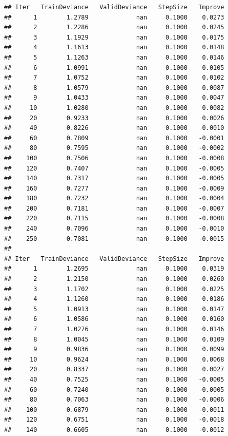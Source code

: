 \documentclass[
]{book}
\begin{document}
\begin{verbatim}
## Iter   TrainDeviance   ValidDeviance   StepSize   Improve
##      1        1.2789             nan     0.1000    0.0273
##      2        1.2286             nan     0.1000    0.0245
##      3        1.1929             nan     0.1000    0.0175
##      4        1.1613             nan     0.1000    0.0148
##      5        1.1263             nan     0.1000    0.0146
##      6        1.0991             nan     0.1000    0.0105
##      7        1.0752             nan     0.1000    0.0102
##      8        1.0579             nan     0.1000    0.0087
##      9        1.0433             nan     0.1000    0.0047
##     10        1.0280             nan     0.1000    0.0082
##     20        0.9233             nan     0.1000    0.0026
##     40        0.8226             nan     0.1000    0.0010
##     60        0.7809             nan     0.1000   -0.0001
##     80        0.7595             nan     0.1000   -0.0002
##    100        0.7506             nan     0.1000   -0.0008
##    120        0.7407             nan     0.1000   -0.0005
##    140        0.7317             nan     0.1000   -0.0005
##    160        0.7277             nan     0.1000   -0.0009
##    180        0.7232             nan     0.1000   -0.0004
##    200        0.7181             nan     0.1000   -0.0007
##    220        0.7115             nan     0.1000   -0.0008
##    240        0.7096             nan     0.1000   -0.0010
##    250        0.7081             nan     0.1000   -0.0015
## 
## Iter   TrainDeviance   ValidDeviance   StepSize   Improve
##      1        1.2695             nan     0.1000    0.0319
##      2        1.2150             nan     0.1000    0.0260
##      3        1.1702             nan     0.1000    0.0225
##      4        1.1260             nan     0.1000    0.0186
##      5        1.0913             nan     0.1000    0.0147
##      6        1.0586             nan     0.1000    0.0160
##      7        1.0276             nan     0.1000    0.0146
##      8        1.0045             nan     0.1000    0.0109
##      9        0.9836             nan     0.1000    0.0099
##     10        0.9624             nan     0.1000    0.0068
##     20        0.8337             nan     0.1000    0.0027
##     40        0.7525             nan     0.1000   -0.0005
##     60        0.7240             nan     0.1000   -0.0005
##     80        0.7063             nan     0.1000   -0.0006
##    100        0.6879             nan     0.1000   -0.0011
##    120        0.6751             nan     0.1000   -0.0018
##    140        0.6605             nan     0.1000   -0.0012

\end{verbatim}
\end{document}

